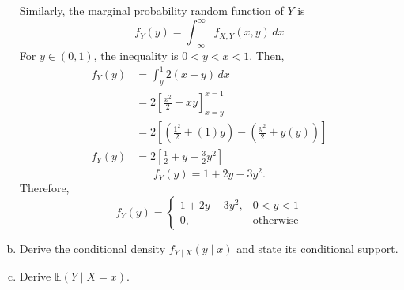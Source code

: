 \documentclass[letterpaper,12pt]{article}
\begin{document}
\begin{enumerate}[(a)]
\begin{list}{}{}
        \vspace{0.5em}
        \noindent Similarly, the marginal probability random function of $Y$ is
        \[        f_Y(y) = \int_{-\infty}^{\infty} f_{X,Y}(x,y) \, dx
        \]
        For $y \in (0, 1)$, the inequality is $0 < y < x < 1$. Then,
        \begin{align*}
        f_Y(y) &= \int_{y}^{1} 2(x + y) \, dx \\
        &= 2 \left[ \frac{x^2}{2} + xy \right]_{x=y}^{x=1} \\
        &= 2 \left[ \left( \frac{1^2}{2} + (1)y \right) - \left( \frac{y^2}{2} + y(y) \right) \right] \\
        f_Y(y) &= 2 \left[ \frac{1}{2} + y - \frac{3}{2}y^2 \right] 
        \end{align*}
        \[             \boxed{f_Y(y)= 1 + 2y - 3y^2.}        \]
        Therefore,
        \[        f_Y(y) = \begin{cases} 1 + 2y - 3y^2, & 0 < y < 1 \\ 0, & \text{otherwise} \end{cases}
        \]
    \end{list}
    \item Derive the conditional density $f_{Y \mid X}(y \mid x)$ and state its conditional support.
   \vspace{0.5em}
    \item Derive $\mathbb{E}(Y \mid X = x)$.
    \vspace{0.5em}
\end{enumerate}
\end{document}
